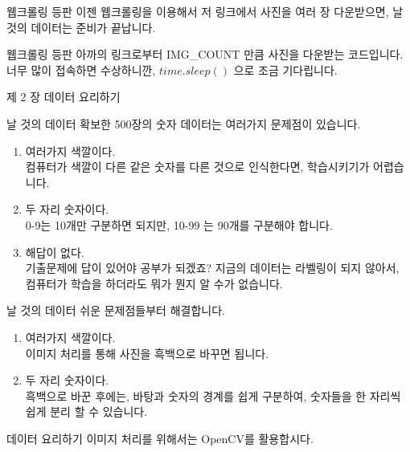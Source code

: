 \documentclass{beamer}
\begin{document}
\begin{frame}{웹크롤링 등판}
  이젠 웹크롤링을 이용해서 저 링크에서 사진을 여러 장 다운받으면, 날 것의
  데이터는 준비가 끝납니다.
\end{frame}

\begin{frame}{웹크롤링 등판}
  아까의 링크로부터 IMG\_COUNT 만큼 사진을 다운받는 코드입니다. 너무 많이 접속하면 수상하니깐,
  $time.sleep()$ 으로 조금 기다립니다.
\end{frame}

\begin{frame}{제 2 장}
  데이터 요리하기
\end{frame}

\begin{frame}{날 것의 데이터}
 확보한 500장의 숫자 데이터는 여러가지 문제점이 있습니다.
  \begin{enumerate}
    \item 여러가지 색깔이다.\\
      컴퓨터가 색깔이 다른 같은 숫자를 다른 것으로 인식한다면, 학습시키기가
      어렵습니다.
    \item 두 자리 숫자이다.\\
      0-9는 10개만 구분하면 되지만, 10-99 는 90개를 구분해야 합니다. 
    \item 해답이 없다.\\
      기출문제에 답이 있어야 공부가 되겠죠? 지금의 데이터는 라벨링이 되지
      않아서, 컴퓨터가 학습을 하더라도 뭐가 뭔지 알 수가 없습니다.
  \end{enumerate}
\end{frame}

\begin{frame}{날 것의 데이터}
  쉬운 문제점들부터 해결합니다.
  \begin{enumerate}
    \item 여러가지 색깔이다.\\
      이미지 처리를 통해 사진을 흑백으로 바꾸면 됩니다.
    \item 두 자리 숫자이다.\\
      흑백으로 바꾼 후에는, 바탕과 숫자의 경계를 쉽게 구분하여, 숫자들을 한
      자리씩 쉽게 분리 할 수 있습니다.
  \end{enumerate}
\end{frame}

\begin{frame}{데이터 요리하기}
  이미지 처리를 위해서는 OpenCV를 활용합시다.
\end{frame}
\end{document}

